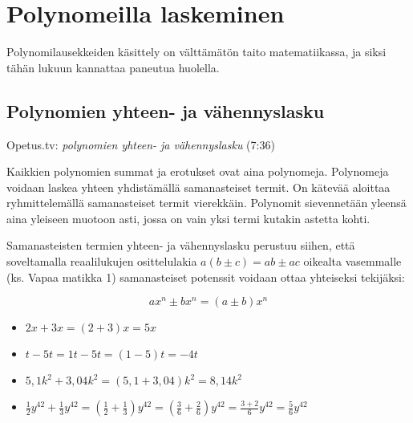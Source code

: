 \section{Polynomeilla laskeminen}

Polynomilausekkeiden käsittely on välttämätön taito matematiikassa, ja siksi tähän lukuun kannattaa paneutua huolella.

\subsection*{Polynomien yhteen- ja vähennyslasku}

{Opetus.tv: \emph{polynomien yhteen- ja vähennyslasku} (7:36)}

Kaikkien polynomien summat ja erotukset ovat aina polynomeja. Polynomeja voidaan laskea yhteen yhdistämällä samanasteiset termit. On kätevää aloittaa ryhmittelemällä samanasteiset termit vierekkäin. Polynomit sievennetään yleensä aina yleiseen muotoon asti, jossa on vain yksi termi kutakin astetta kohti.

Samanasteisten termien yhteen- ja vähennyslasku perustuu siihen, että soveltamalla reaalilukujen osittelulakia $a(b\pm c)=ab\pm ac$ oikealta vasemmalle (ks. Vapaa matikka 1) samanasteiset potenssit voidaan ottaa yhteiseksi tekijäksi:

\[ ax^n \pm bx^n = (a \pm b)x^n \]

\begin{esimerkki}

	\begin{itemize}
	\item $2x+3x=(2+3)x=5x$
	\item $t-5t=1t-5t=(1-5)t=-4t$
	\item $5,1k^2+3,04k^2 = (5,1+3,04)k^2 = 8,14k^2$
	\item $\frac{1}{2}y^{42}+\frac{1}{3}y^{42}=(\frac{1}{2}+\frac{1}{3})y^{42}= (\frac{3}{6}+\frac{2}{6})y^{42}=\frac{3+2}{6}y^{42}=\frac{5}{6}y^{42}$
	\end{itemize}
\end{esimerkki}

